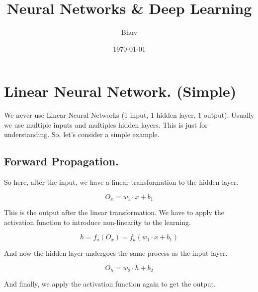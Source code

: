 \documentclass[12pt]{article}
\title{\textbf{Neural Networks \& Deep Learning}}
\author{ Bhuv }
\date{\today}
\begin{document}
\maketitle    

\section*{Linear Neural Network. (Simple)}

We never use Linear Neural Networks (1 input, 1 hidden layer, 1 output). Usually we use multiple inputs and multiples hidden layers. This is just for understanding. So, let's consider a simple example.

\begin{center}
\end{center}

\subsection*{Forward Propagation.}

So here, after the input, we have a linear transformation to the hidden layer. 

\[
    O_{x} = w_1 \cdot x + b_1
\]

This is the output after the linear transformation. We have to apply the activation function to introduce non-linearity to the learning. 

\[
    h = f_{a} (O_{x}) = f_{a} (w_1 \cdot x + b_1)
\]

And now the hidden layer undergoes the same process as the input layer. 

\[
    O_{h} = w_2 \cdot h + b_2
\]

And finally, we apply the activation function again to get the output.
\end{document}

